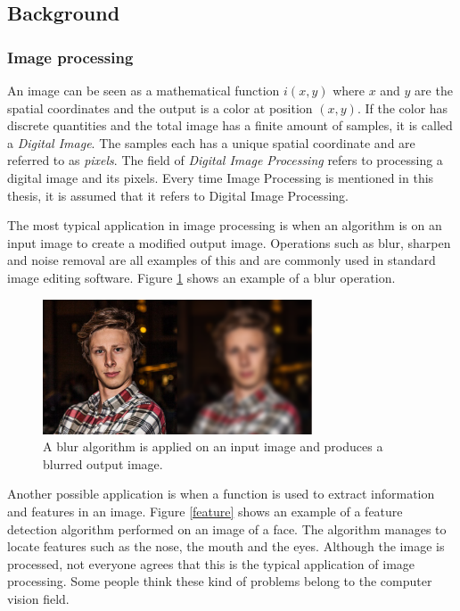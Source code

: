 \subsection{Background}
\subsubsection{Image processing}
An image can be seen as a mathematical function $i(x,y)$ where $x$ and $y$ are the spatial coordinates and the output is a color at position $(x,y)$. If the color has discrete quantities and the total image has a finite amount of samples, it is called a \emph{Digital Image}\cite{ipbook}. The samples each has a unique spatial coordinate and are referred to as \emph{pixels}. The field of \emph{Digital Image Processing} refers to processing a digital image and its pixels. Every time Image Processing is mentioned in this thesis, it is assumed that it refers to Digital Image Processing. 
\newline

The most typical application in image processing is when an algorithm is on an input image to create a modified output image. Operations such as blur, sharpen and noise removal are all examples of this and are commonly used in standard image editing software. Figure \ref{lena} shows an example of a blur operation.
\begin{figure}[ht!]
\centering
\includegraphics[width=80mm]{img/klas.png}
\caption{A blur algorithm is applied on an input image and produces a blurred output image.}
\label{lena}
\end{figure}

Another possible application is when a function is used to extract information and features in an image. Figure \ref{feature} shows an example of a feature detection algorithm performed on an image of a face. The algorithm manages to locate features such as the nose, the mouth and the eyes. Although the image is processed, not everyone agrees that this is the typical application of image processing. Some people think these kind of problems belong to the computer vision field. 

